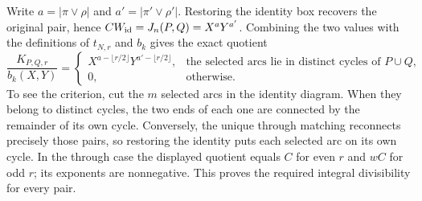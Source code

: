 Write \(a=|\pi\vee\rho|\) and \(a'=|\pi'\vee\rho'|\). Restoring
the identity box recovers the original pair, hence
\(C W_{\rm id}=J_n(P,Q)=X^aY^{a'}\). Combining the two values with
the definitions of \(t_{N,r}\) and \(b_k\) gives the exact quotient
\begin{equation}
\frac{K_{P,Q,r}}{b_k(X,Y)}
=
\begin{cases}
 X^{a-\lfloor r/2\rfloor}Y^{a'-\lfloor r/2\rfloor},
   &\text{the selected arcs lie in distinct cycles of }P\cup Q,\\
 0,&\text{otherwise}.
\end{cases} \label{eq:through-quotient}
\end{equation}
To see the criterion, cut the \(m\) selected arcs in the identity
diagram. When they belong to distinct cycles, the two ends of each
one are connected by the remainder of its own cycle. Conversely, the
unique through matching reconnects precisely those pairs, so
restoring the identity puts each selected arc on its own cycle.
In the through case the displayed quotient equals \(C\) for even
\(r\) and \(wC\) for odd \(r\); its exponents are nonnegative.
This proves the required integral divisibility for every pair.
